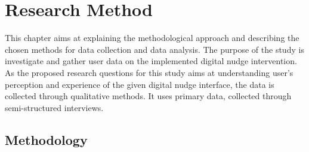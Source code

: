 \chapter{Research Method}
This chapter aims at explaining the methodological approach and describing the chosen methods for data collection and data analysis. The purpose of the study is investigate and gather user data on the implemented digital nudge intervention. As the proposed research questions for this study aims at understanding user's perception and experience of the given digital nudge interface, the data is collected through qualitative methods. It uses primary data, collected through semi-structured interviews. 

\section{Methodology}






